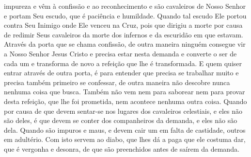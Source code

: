impureza e vêm à confissão e ao reconhecimento e são cavaleiros de Nosso Senhor
e portam Seu escudo, que é paciência e humildade. Quando tal escudo
Ele portou contra Seu Inimigo onde Ele venceu na Cruz, pois que dirigiu a morte
por causa de redimir Seus cavaleiros da morte dos infernos e da escuridão em
que estavam. Através da porta que se chama confissão, de outra maneira ninguém
consegue vir a Nosso Senhor Jesus Cristo e precisa estar nesta demanda e
converte o ser de cada um e transforma de novo a refeição que lhe é
transformada. E quem quiser entrar através de outra porta, é para entender que
precisa se trabalhar muito e precisa também primeiro se confessar, de outra
maneira não descobre nunca nenhuma coisa que busca. Também não vem nem para
saborear nem para provar desta refeição, que lhe foi prometida, nem acontece
nenhuma outra coisa. Quando por causa de que devem sentar-se nos lugares dos
cavaleiros celestiais, e eles não são deles, é que devem se conter dos
companheiros da demanda, e eles não são dela. Quando são impuros e maus, e
devem cair um em falta de castidade, outros em adultério. Com isto servem ao
diabo, que lhes dá a paga que ele costuma dar, que é vergonha e desonra, de que
são preenchidos antes de saírem da demanda.

